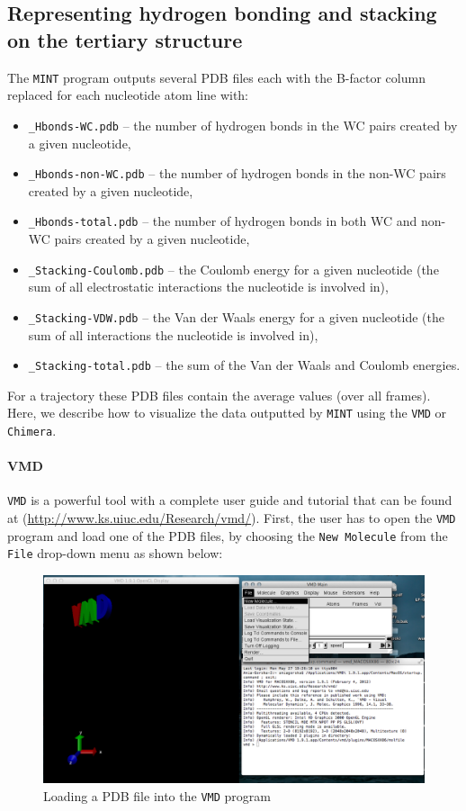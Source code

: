 \documentclass[12pt]{article}
\begin{document}
\subsection{Representing hydrogen bonding and stacking on the tertiary structure} 
The {\tt MINT} program outputs several PDB files each with the B-factor column  replaced for each nucleotide atom line with:
\begin{itemize}
\item {\tt \_Hbonds-WC.pdb} -- the number of hydrogen bonds in the WC pairs created by a given nucleotide,
\item {\tt \_Hbonds-non-WC.pdb} -- the number of hydrogen bonds in the non-WC pairs created by a given nucleotide,
\item {\tt \_Hbonds-total.pdb} -- the number of hydrogen bonds in both  WC and non-WC pairs created by a given nucleotide,
\item {\tt \_Stacking-Coulomb.pdb} -- the Coulomb energy for a given nucleotide  (the sum of all electrostatic interactions the nucleotide is involved in),
\item {\tt \_Stacking-VDW.pdb} -- the Van der Waals energy for a given nucleotide (the sum of all interactions the nucleotide is involved in),
\item {\tt \_Stacking-total.pdb} -- the sum of the Van der Waals and Coulomb energies. 
\end{itemize}

For a trajectory these PDB files contain the average values (over all frames). Here, we  describe how to visualize the data outputted by {\tt MINT} using the {\tt VMD} or {\tt Chimera}.

\paragraph{VMD}
{\tt VMD} is a powerful tool with a complete user guide and tutorial that can be found at (\url{http://www.ks.uiuc.edu/Research/vmd/}).
First, the user has to open the {\tt VMD} program and load one of the PDB files, by choosing the {\tt New Molecule} from the {\tt File} drop-down menu as shown below:

\begin{figure}[h!]
\centering
\includegraphics[scale=0.4]{./pictures/vmd1.png}
\caption{Loading a PDB file into the {\tt VMD} program}
\end{figure}
\end{document}
